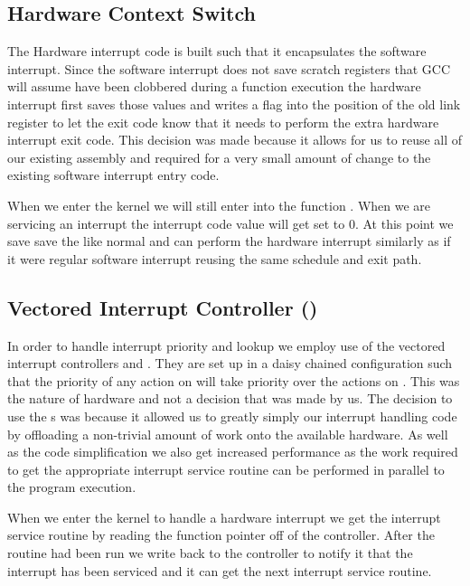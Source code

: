 \documentclass[pdftex,10pt,a4paper]{article}
\begin{document}
\subsection*{Hardware Context Switch}

The Hardware interrupt code is built such that it encapsulates the software
interrupt. Since the software interrupt does not save scratch registers that
GCC will assume have been clobbered during a function execution the hardware
interrupt first saves those values and writes a flag into the position of the
old link register to let the exit code know that it needs to perform the extra
hardware interrupt exit code. This decision was made because it allows for us
to reuse all of our existing assembly and required for a very small amount of
change to the existing software interrupt entry code.

When we enter the kernel we will still enter into the function
. When we are servicing an interrupt the interrupt code
value will get set to 0. At this point we save save the  like normal
and can perform the hardware interrupt similarly as if it were regular software
interrupt reusing the same schedule and exit path.

\subsection*{Vectored Interrupt Controller ()}

In order to handle interrupt priority and lookup we employ use of the vectored
interrupt controllers  and . They are set up in a daisy
chained configuration such that the priority of any action on  will
take priority over the actions on . This was the nature of hardware
and not a decision that was made by us. The decision to use the s was
because it allowed us to greatly simply our interrupt handling code by
offloading a non-trivial amount of work onto the available hardware. As well
as the code simplification we also get increased performance as the work
required to get the appropriate interrupt service routine can be performed in
parallel to the program execution.

When we enter the kernel to handle a hardware interrupt we get the interrupt
service routine by reading the function pointer off of the 
controller. After the routine had been run we write back to the controller to
notify it that the interrupt has been serviced and it can get the next
interrupt service routine.
\end{document}
